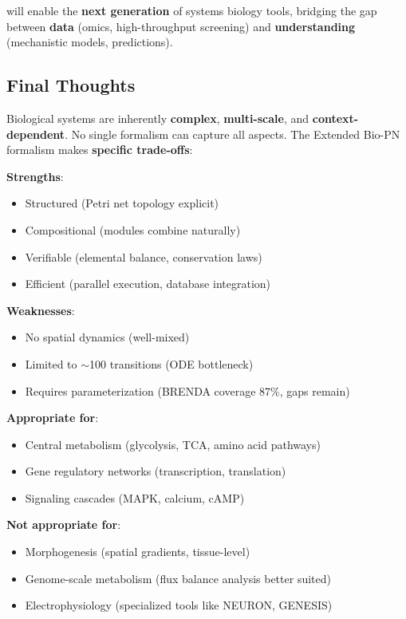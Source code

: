 will enable the \textbf{next generation} of systems biology tools, bridging the gap between \textbf{data} (omics, high-throughput screening) and \textbf{understanding} (mechanistic models, predictions).

\subsection{Final Thoughts}
\label{subsec:final-thoughts}

Biological systems are inherently \textbf{complex}, \textbf{multi-scale}, and \textbf{context-dependent}. No single formalism can capture all aspects. The Extended Bio-PN formalism makes \textbf{specific trade-offs}:

\textbf{Strengths}:
\begin{itemize}
    \item Structured (Petri net topology explicit)
    \item Compositional (modules combine naturally)
    \item Verifiable (elemental balance, conservation laws)
    \item Efficient (parallel execution, database integration)
\end{itemize}

\textbf{Weaknesses}:
\begin{itemize}
    \item No spatial dynamics (well-mixed)
    \item Limited to $\sim$100 transitions (ODE bottleneck)
    \item Requires parameterization (BRENDA coverage 87\%, gaps remain)
\end{itemize}

\textbf{Appropriate for}:
\begin{itemize}
    \item Central metabolism (glycolysis, TCA, amino acid pathways)
    \item Gene regulatory networks (transcription, translation)
    \item Signaling cascades (MAPK, calcium, cAMP)
\end{itemize}

\textbf{Not appropriate for}:
\begin{itemize}
    \item Morphogenesis (spatial gradients, tissue-level)
    \item Genome-scale metabolism (flux balance analysis better suited)
    \item Electrophysiology (specialized tools like NEURON, GENESIS)
\end{itemize}

